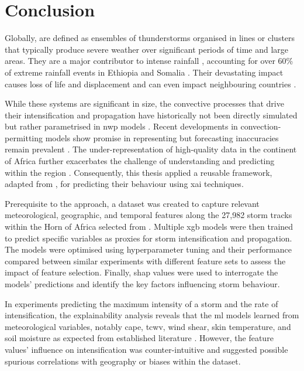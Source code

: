 \chapter{Conclusion}
\label{ch:con}

Globally,  are defined as ensembles of thunderstorms organised in lines or clusters that typically produce severe weather over significant periods of time and large areas. They are a major contributor to intense rainfall \citep{Houze2004}, accounting for over 60\% of extreme rainfall events in Ethiopia and Somalia \citep{Hill2023}. Their devastating impact causes loss of life and displacement and can even impact neighbouring countries \citep{Mamo2019,Mekuria2022,Legese2020,Zaroug2014}. 

While these systems are significant in size, the convective processes that drive their intensification and propagation have historically not been directly simulated but rather parametrised in \acrfull{nwp} models \citep{Stevens2019,Yano2018,Keane2025}. Recent developments in convection-permitting models show promise in representing  but forecasting inaccuracies remain prevalent \citep{Feng2025,Yano2018}. The under-representation of high-quality data in the continent of Africa further exacerbates the challenge of understanding and predicting  within the region \citep{Dinku2019,Kinyondo2018,Meque2021}. Consequently, this thesis applied a reusable framework, adapted from \cite{Hunt2024}, for predicting their behaviour using \acrfull{xai} techniques. 

Prerequisite to the approach, a dataset was created to capture relevant meteorological, geographic, and temporal features along the 27,982 storm tracks within the Horn of Africa selected from \cite{Hill2023}. Multiple \acrfull{xgb} models were then trained to predict specific variables as proxies for storm intensification and propagation. The models were optimised using hyperparameter tuning and their performance compared between similar experiments with different feature sets to assess the impact of feature selection. Finally, \acrshort{shap} values were used to interrogate the models' predictions and identify the key factors influencing storm behaviour.

In experiments predicting the maximum intensity of a storm and the rate of intensification, the explainability analysis reveals that the \acrfull{ml} models learned from meteorological variables, notably \acrfull{cape}, \acrfull{tcwv}, wind shear, skin temperature, and soil moisture as expected from established literature \citep{Barton2021,Taylor2017,Li2023,Klein2020,Klein2021}. However, the feature values' influence on intensification was counter-intuitive and suggested possible spurious correlations with geography or biases within the dataset. 

